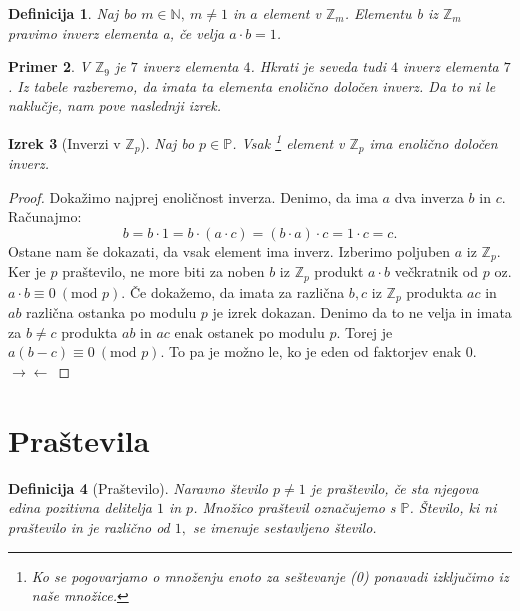 \documentclass{amsart}
\newcommand{\NN}{\mathbb{N}}
\newcommand{\PP}{\mathbb{P}}
\newcommand{\ZZ}{\mathbb{Z}}
\newtheorem{izrek}{Izrek}[section]
\newtheorem{definicija}[izrek]{Definicija}
\newtheorem{primer}[izrek]{Primer}
\begin{document}
\begin{definicija}
    Naj bo $m \in \NN,\ m \neq 1$ in $a$ element v $\ZZ_m$. Elementu b iz $\ZZ_m$ pravimo \emph{inverz elementa a}, če velja
    $a \cdot b = 1$.
\end{definicija}

\begin{primer}
    V $\ZZ_9$ je $7$ inverz elementa $4$. Hkrati je seveda tudi $4$ inverz elementa $7$. Iz tabele razberemo, da imata ta 
    elementa enolično določen inverz. Da to ni le naklučje, nam pove naslednji izrek.
\end{primer}

\begin{izrek}[Inverzi v $\ZZ_p$]
    Naj bo $p \in \PP$. Vsak \footnote{Ko se pogovarjamo o množenju enoto za seštevanje (0) ponavadi izključimo iz 
    naše množice.}  element v $\ZZ_p$ ima enolično določen inverz.
\end{izrek}

\begin{proof}
    Dokažimo najprej enoličnost inverza. Denimo, da ima $a$ dva inverza $b$ in $c$. Računajmo: 
    \[b = b\cdot1 = b\cdot (a\cdot c)=(b\cdot a)\cdot c = 1\cdot c= c.\]
    Ostane nam še dokazati, da vsak element ima inverz. Izberimo poljuben $a$ iz $\ZZ_p$. Ker je $p$ praštevilo,
    ne more biti za noben $b$ iz $\ZZ_p$ produkt $a\cdot b$ večkratnik od $p$ oz. $a\cdot b \equiv 0\ (\text{mod }p)$. 
    Če dokažemo, da imata za različna $b, c$ iz $\ZZ_p$ produkta $ ac$ in $ab$ različna ostanka po modulu $p$ je izrek dokazan. 
    Denimo da to ne velja in imata za $b \neq c$ produkta $ab$ in $ac$ enak ostanek po modulu $p$. Torej je 
    $a(b-c) \equiv 0\ (\text{mod }p)$. To pa je možno le, ko je eden od faktorjev enak 0. \(\to \gets\)
\end{proof}

\newpage
\section{Praštevila}

\begin{definicija}[Praštevilo]
    Naravno število \(p \neq 1\) je \emph{praštevilo}, če sta njegova edina pozitivna delitelja \(1\) in \(p\). 
    Množico praštevil označujemo s \(\PP\). Število, ki ni praštevilo in je različno od \(1,\) se imenuje \emph{sestavljeno število}.
\end{definicija}
\end{document}
